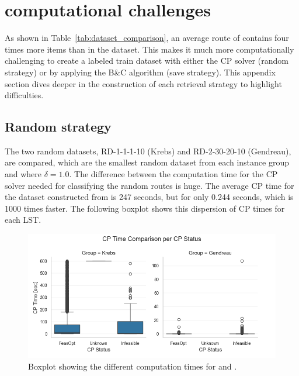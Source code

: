 \clearpage
\chapter{\krebsADataSetText computational challenges}
\label{app:sec:krebs_computationally_challenges}

As shown in Table~\ref{tab:dataset_comparison}, an average route of \krebsADataSetText contains four times more items than
in the \gendreauDataSetText dataset. This makes it much more computationally challenging to create a labeled train dataset with either
the \gls{CP} solver (random strategy) or by applying the B\&C algorithm (save strategy). This appendix section dives deeper in
the construction of each retrieval strategy to highlight difficulties.

\section{Random strategy}
\label{sec:challenges_krebs_random}

The two random datasets, RD-1-1-1-10 (Krebs) and RD-2-30-20-10 (Gendreau), are compared, which are the smallest random dataset from each instance group and
where $\delta = 1.0$. The difference between the computation time for the \gls{CP} solver needed for classifying the random routes is huge. The average
\gls{CP} time for the dataset constructed from \krebsADataSetText is 247 seconds, but for \gendreauDataSetText only 0.244 seconds,
which is 1000 times faster. The following boxplot shows this dispersion of \gls{CP} times for each \gls{LST}.
\begin{figure}[ht]
	\centering
	\includegraphics[width=\textwidth]{pictures/comparison_krebs_gendreau/boxplot_cp_time.png}
	\caption{Boxplot showing the different computation times for \krebsADataSetText and \gendreauDataSet.}
	\label{fig:comparison_krebs_gendreau_boxplot}
\end{figure}

